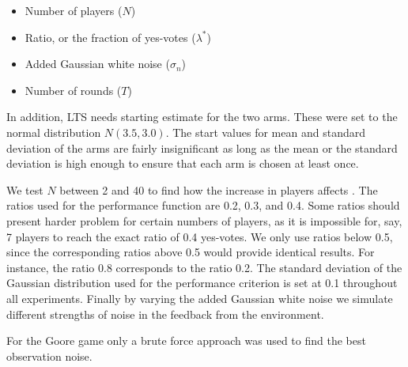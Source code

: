 \begin{itemize}
    \item Number of players ($N$)
    \item Ratio, or the fraction of yes-votes ($\lambda^*$)
    \item Added Gaussian white noise ($\sigma_n$)
    \item Number of rounds ($T$)
\end{itemize}

In addition, LTS needs starting estimate for the two arms.
These were set to the normal distribution $N(3.5,3.0)$.
The start values for mean and standard deviation of the arms are fairly insignificant as long as the mean or the standard deviation is high enough to ensure that each arm is chosen at least once.

We test $N$ between 2 and 40 to find how the increase in players affects \obstar{}.
The ratios used for the performance function are 0.2, 0.3, and 0.4.
Some ratios should present harder problem for certain numbers of players, as it is impossible for, say, 7 players to reach the exact ratio of 0.4 yes-votes.
We only use ratios below 0.5, since the corresponding ratios above 0.5 would provide identical results.
For instance, the ratio 0.8 corresponds to the ratio 0.2.
The standard deviation of the Gaussian distribution used for the performance criterion is set at 0.1 throughout all experiments.
Finally by varying the added Gaussian white noise we simulate different strengths of noise in the feedback from the environment.

For the Goore game only a brute force approach was used to find the best observation noise.




